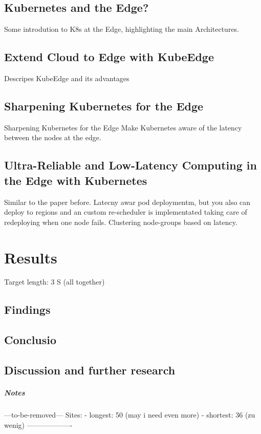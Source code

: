 \documentclass[MSC,Master,english]{twbook}%
\begin{document}
\section{Kubernetes and the Edge?}
Some introdution to K8s at the Edge, highlighting the main Architectures.
\section{Extend Cloud to Edge with KubeEdge}
Descripes KubeEdge and its advantages
\section{Sharpening Kubernetes for the Edge}
Sharpening Kubernetes for the Edge
Make Kubernetes aware of the latency between the nodes at the edge.
\section{Ultra-Reliable and Low-Latency Computing in the Edge with Kubernetes}
Similar to the paper before. Latecny awar pod deploymentm, but you also can deploy to regions and an custom re-scheduler is implementated taking care of redeploying when one node fails.
Clustering node-groups based on latency.


\chapter{Results}
\label{chap:results}

Target length: 3 S (all together)
\section{Findings}
\label{sec:findings}

\section{Conclusio}
\label{sec:conclusio}

\section{Discussion and further research}
\label{sec:discuss}

\paragraph{Notes}
---to-be-removed---
Sites:
- longest: 50 (may i need even more)
- shortest: 36 (zu wenig)
-------------------
\end{document}
